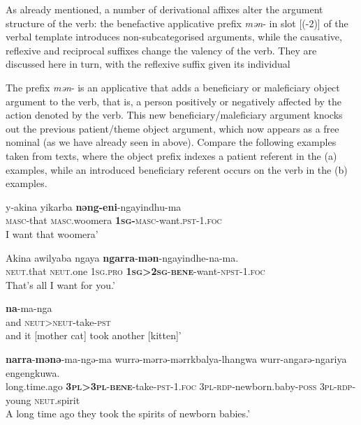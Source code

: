 \documentclass[output=paper]{langscibook}
\begin{document}
As already mentioned, a number of derivational affixes alter the argument structure of the verb: the benefactive applicative prefix \textit{mən}- in slot [(-2)] of the verbal template introduces non-subcategorised arguments, while the causative, reflexive and reciprocal suffixes change the valency of the verb. They are discussed here in turn, with the reflexive suffix given its individual 



\label{sec:vanegmond:2.3.3.1}

The prefix \textit{mən}- is an applicative that adds a beneficiary or maleficiary object argument to the verb, that is, a person positively or negatively affected by the action denoted by the verb. This new beneficiary/maleficiary argument knocks out the previous patient/theme object argument, which now appears as a free nominal (as we have already seen in  above). Compare the following examples taken from texts, where the object prefix indexes a patient referent in the (a) examples, while an introduced beneficiary referent occurs on the verb in the (b) examples.


\ea%
 \label{ex:vanegmond:12}
 \ea
 \label{ex:vanegmond:12a}
\gll y-akina yikarba \textbf{{nəng-eni}}{-ngayindhu-ma}\\
\textsc{masc}-that \textsc{masc}.woomera \textbf{\textsc{1sg}}\textbf{-}\textsc{masc}-want.\textsc{pst}-1.\textsc{foc}\\
\glt I want that woomera’


 \ex
 \label{ex:vanegmond:12b}
\gll Akina awilyaba ngaya \textbf{{ngarra}}{-}\textbf{{mən}}{-ngayindhe-na-ma}.\\
\textsc{neut}.that \textsc{neut}.one \textsc{1sg.pro} \textbf{\textsc{1sg>2sg}}-\textbf{\textsc{bene}}-want-\textsc{npst}-1.\textsc{foc}\\
\glt That’s all I want for you.’
\z
\z



\ea%
 \label{ex:vanegmond:13}

 \ea
 \label{ex:vanegmond:13a}
 \textbf{{na}}{-ma-nga}\\
and \textsc{neut}>\textsc{neut}-take-\textsc{pst}\\
\glt and it [mother cat] took another [kitten]’

 \ex
 \label{ex:vanegmond:13b}
 \textbf{{narra}}{-}\textbf{{mənə}}-ma-ngə-ma wurrə-mərrə-mərrkbalya-lhangwa wurr-angarə-ngariya engengkuwa.\\
long.time.ago \textbf{\textsc{3pl>3pl}}-\textbf{\textsc{bene}}-take-\textsc{pst}-1.\textsc{foc} \textsc{3pl}-\textsc{rdp}-newborn.baby-\textsc{poss} \textsc{3pl}-\textsc{rdp}-young \textsc{neut}.spirit\\
\glt A long time ago they took the spirits of newborn babies.’
\z
\z
\end{document}
